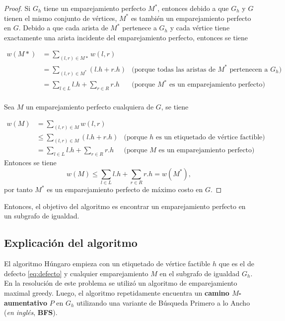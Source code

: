 \documentclass[10pt]{article} %
\begin{document}
\begin{proof}
	Si $G_h$ tiene un emparejamiento perfecto $M^*$, entonces debido a que $G_h$ y $G$ tienen el mismo conjunto de v\'ertices, $M^*$ es tambi\'en un emparejamiento perfecto en $G$. Debido a que cada arista de $M^*$ pertenece a $G_h$ y cada v\'ertice tiene exactamente una arista incidente del emparejamiento perfecto, entonces se tiene
	
	\begin{align}
		w(M*) &= \sum_{(l,r) \in M*} w(l,r)\\
		&= \sum_{(l,r) \in M^*}(l.h + r.h) &\text{(porque todas las aristas de $M^*$ pertenecen a $G_h$)}\\
		&= \sum_{l \in L}l.h + \sum_{r \in R} r.h &\text{(porque $M^{*}$ es un emparejamiento perfecto)}\\
	\end{align} 
	
	Sea $M$ un emparejamiento perfecto cualquiera de $G$, se tiene
	
	\begin{align}
		w(M) &= \sum_{(l,r) \in M} w(l,r)\\
		&\leq \sum_{(l,r) \in M} (l.h + r.h) &\text{(porque $h$ es un etiquetado de v\'ertice factible)}\\
		&= \sum_{l \in L} l.h + \sum_{r \in R} r.h &\text{(porque $M$ es un emparejamiento perfecto)}
	\end{align}
	Entonces se tiene
	\begin{equation}
		w(M) \leq \sum_{l \in L} l.h + \sum_{r \in R} r.h = w(M^*),
	\end{equation}
	por tanto $M^*$ es un emparejamiento perfecto de m\'aximo costo en $G$.
\end{proof}

Entonces, el objetivo del algoritmo es encontrar un emparejamiento perfecto en un subgrafo de igualdad. 

\subsection{Explicaci\'on del algoritmo}


El algoritmo H\'ungaro empieza con un etiquetado de v\'ertice factible $h$ que es el de defecto \ref{eq:defecto} y cualquier emparejamiento $M$ en el subgrafo de igualdad $G_h$.  En la resoluci\'on de este problema se utiliz\'o un algoritmo de emparejamiento maximal greedy. Luego, el algoritmo repetidamente encuentra un \textbf{camino $M$-aumentativo} $P$ en $G_h$ utilizando una variante de B\'usqueda Primero a lo Ancho (\textit{en ingl\'es}, \textbf{BFS}). 
\end{document}
